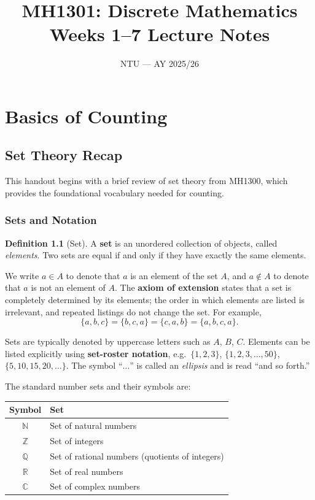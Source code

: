 \documentclass[11pt, a4paper, notitlepage]{report}
\title{\textbf{MH1301: Discrete Mathematics}\\[0.5em]
       \large Weeks 1--7 Lecture Notes}
\author{NTU --- AY 2025/26}
\date{}
\makeatletter
\theoremstyle{definition}
\newtheorem{definition}[theorem]{Definition}
\theoremstyle{remark}
\renewcommand\tableofcontents{%
  \section*{\contentsname}%
  \@starttoc{toc}%
}
\makeatother
\begin{document}
\maketitle
\tableofcontents
\newpage

\chapter{Basics of Counting}
\label{chap:counting}

\section{Set Theory Recap}

This handout begins with a brief review of set theory from MH1300, which provides the
foundational vocabulary needed for counting.

\subsection{Sets and Notation}

\begin{definition}[Set]
\label{def:set}
A \textbf{set} is an unordered collection of objects, called \emph{elements}. Two sets are
equal if and only if they have exactly the same elements.
\end{definition}

We write $a \in A$ to denote that $a$ is an element of the set $A$, and $a \notin A$ to denote
that $a$ is not an element of $A$. The \textbf{axiom of extension} states that a set is
completely determined by its elements; the order in which elements are listed is irrelevant, and
repeated listings do not change the set. For example,
\[
  \{a, b, c\} = \{b, c, a\} = \{c, a, b\} = \{a, b, c, a\}.
\]

Sets are typically denoted by uppercase letters such as $A$, $B$, $C$. Elements can be listed
explicitly using \textbf{set-roster notation}, e.g.\ $\{1, 2, 3\}$, $\{1, 2, 3, \ldots, 50\}$,
$\{5, 10, 15, 20, \ldots\}$. The symbol ``$\ldots$'' is called an \emph{ellipsis} and is read
``and so forth.''

The standard number sets and their symbols are:

\begin{center}
\begin{tabular}{cl}
\toprule
\textbf{Symbol} & \textbf{Set} \\
\midrule
$\mathbb{N}$ & Set of natural numbers \\
$\mathbb{Z}$ & Set of integers \\
$\mathbb{Q}$ & Set of rational numbers (quotients of integers) \\
$\mathbb{R}$ & Set of real numbers \\
$\mathbb{C}$ & Set of complex numbers \\
\bottomrule
\end{tabular}
\end{center}
\end{document}
